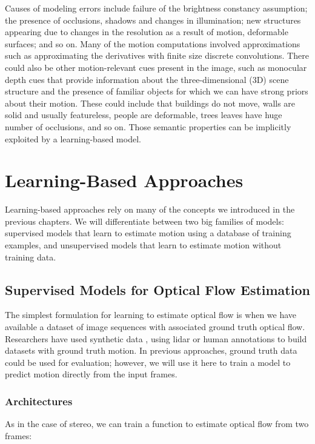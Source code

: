 Causes of modeling errors include failure of the brightness constancy assumption; the presence of occlusions, shadows and changes in illumination; new structures appearing due to changes in the resolution as a result of motion, deformable surfaces; and so on. Many of the motion computations involved approximations such as approximating the derivatives with finite size discrete convolutions. There could also be other motion-relevant cues present in the image, such as monocular depth cues that provide information about the three-dimensional (3D) scene structure and the presence of familiar objects for which we can have strong priors about their motion. These could include that buildings do not move, walls are solid and usually featureless, people are deformable, trees leaves have huge number of occlusions, and so on. Those semantic properties can be implicitly exploited by a learning-based model.

\section{Learning-Based Approaches}


Learning-based approaches rely on many of the concepts we introduced in the previous chapters. We will differentiate between two big families of models: supervised models that learn to estimate motion using a database of training examples, and unsupervised models that learn to estimate motion without training data.


\subsection{Supervised Models for Optical Flow Estimation}

The simplest formulation for learning to estimate optical flow is when we have available a dataset of image sequences with associated ground truth optical flow. Researchers have used synthetic data \cite{Butler:ECCV:2012}, using lidar \cite{Geiger2013} or human annotations \cite{Liu2008} to build datasets with ground truth motion. In previous approaches, ground truth data could be used for evaluation; however, we will use it here to train a model to predict motion directly from the input frames. 

\subsubsection{Architectures}

As in the case of stereo, we can train a function to estimate optical flow from two frames:

